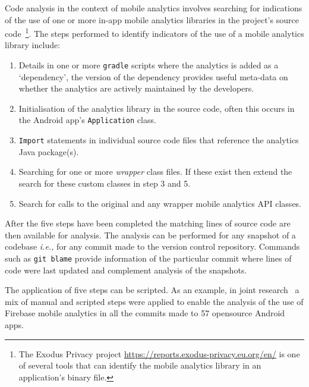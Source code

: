 Code analysis in the context of mobile analytics involves searching for indications of the use of one or more in-app mobile analytics libraries in the project's source code~\footnote{The Exodus Privacy project \url{https://reports.exodus-privacy.eu.org/en/} is one of several tools that can identify the mobile analytics library in an application's binary file.}. The steps performed to identify indicators %
of the use of a mobile analytics library include:
\begin{enumerate}
    \itemsep 0em
    \item Details in one or more \texttt{gradle} scripts where the analytics is added as a `dependency', the version of the dependency provides useful meta-data on whether the analytics are actively maintained by the developers. %
    \item Initialisation of the analytics library in the source code, often this occurs in the Android app's \texttt{Application} class. %
    \item \texttt{Import} statements in individual source code files that reference the analytics Java package(s).
    \item Searching for one or more \textit{wrapper} class files. If these exist then extend the search for these custom classes in step 3 and 5.
    \item Search for calls to the original and any wrapper mobile analytics API classes. %
\end{enumerate}

After the five steps have been completed the matching lines of source code are then available for analysis. 
%
The analysis can be performed for any snapshot of a codebase \textit{i.e.,} for any commit made to the version control repository. Commands such as \texttt{git blame} provide information of the particular commit where lines of code were last updated and complement analysis of the snapshots.

The application of five steps can be scripted. As an example, in joint research~\citep{harty2021_logging_practices_arxiv} a mix of manual and scripted steps were applied to enable the analysis of the use of Firebase mobile analytics in all the commits made to 57 opensource Android apps.

